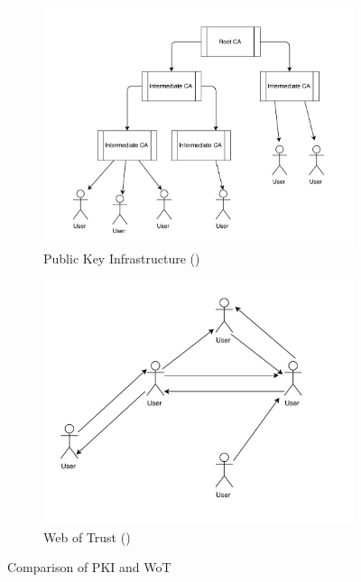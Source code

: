 \begin{figure}
	\centering
	\begin{subfigure}{.5\textwidth}
		\centering
		\includegraphics[width=1\linewidth]{figures/PKI}
		\caption{ Public Key Infrastructure ()}
		\label{fig:pki}
	\end{subfigure}%
	\begin{subfigure}{.5\textwidth}
		\centering
		\includegraphics[width=1\linewidth]{figures/WOT}
		\caption{ Web of Trust ()}
		\label{fig:wot}
	\end{subfigure}
	\caption{Comparison of PKI and WoT}
	\label{fig:pkiwot}
\end{figure}


